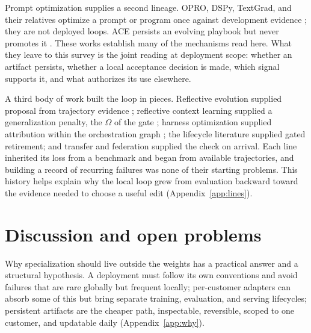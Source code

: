 Prompt optimization supplies a second lineage. OPRO, DSPy, TextGrad, and their relatives optimize a prompt or program once against development evidence \citep{yang2023opro, khattab2023dspy, yuksekgonul2024textgrad}; they are not deployed loops. ACE persists an evolving playbook but never promotes it \citep{ace2025agentic}. These works establish many of the mechanisms read here. What they leave to this survey is the joint reading at deployment scope: whether an artifact persists, whether a local acceptance decision is made, which signal supports it, and what authorizes its use elsewhere.

A third body of work built the loop in pieces. Reflective evolution supplied proposal from trajectory evidence \citep{agrawal2025gepa}; reflective context learning supplied a generalization penalty, the \(\Omega\) of the gate \citep{vassilyev2026rcl}; harness optimization supplied attribution within the orchestration graph \citep{lee2026metaharness, nguyen2026harnessevo}; the lifecycle literature supplied gated retirement; and transfer and federation supplied the check on arrival. Each line inherited its loss from a benchmark and began from available trajectories, and building a record of recurring failures was none of their starting problems. This history helps explain why the local loop grew from evaluation backward toward the evidence needed to choose a useful edit (Appendix~\ref{app:lines}).

\section{Discussion and open problems}\label{sec:discussion}

Why specialization should live outside the weights has a practical answer and a structural hypothesis. A deployment must follow its own conventions and avoid failures that are rare globally but frequent locally; per-customer adapters \citep{hu2021lora} can absorb some of this but bring separate training, evaluation, and serving lifecycles; persistent artifacts are the cheaper path, inspectable, reversible, scoped to one customer, and updatable daily (Appendix~\ref{app:why}).

